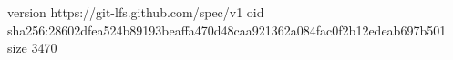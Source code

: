 version https://git-lfs.github.com/spec/v1
oid sha256:28602dfea524b89193beaffa470d48caa921362a084fac0f2b12edeab697b501
size 3470

